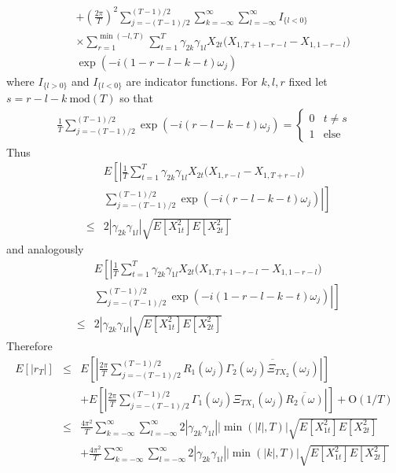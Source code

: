 \documentclass[a4paper]{book}
\begin{document}
\begin{appendix}
\begin{eqnarray*}
&&+\left(\frac{2\pi}{T}\right)^2\sum_{j=-(T-1)/2}^{(T-1)/2}\sum_{k=-\infty}^\infty
\sum_{l=-\infty}^\infty
I_{\{l<0\}}\\
&&\times\sum_{r=1}^{\min(-l,T)} \sum_{t=1}^{T} \gamma_{2k}\gamma_{1l}X_{2t} \Big(X_{1,T+1-r-l}-X_{1,1-r-l}\Big)\\
&&\exp(-i(1-r-l-k-t)\omega_j)
\end{eqnarray*}
where $I_{\{l>0\}}$ and $I_{\{l<0\}}$ are indicator functions. For
$k,l,r$ fixed let\\ $s=r-l-k ~\textrm{mod}(T)$ so that
\begin{eqnarray*}
\frac{1}{T}\sum_{j=-(T-1)/2}^{(T-1)/2}
\exp(-i(r-l-k-t)\omega_j)=\left\{\begin{array}{cc}
0& t\not=s\\
1& \textrm{else}
\end{array}\right.
\end{eqnarray*}
Thus
\begin{eqnarray*}
&&E\left[\left|\frac{1}{T} \sum_{t=1}^{T}
\gamma_{2k}\gamma_{1l}X_{2t} \Big(X_{1,r-l}-X_{1,T+r-l}\Big)\right.\right.\\
&&\left.\left.\sum_{j=-(T-1)/2}^{(T-1)/2}\exp(-i(r-l-k-t)\omega_j)\right|\right]\\
&\leq& 2|\gamma_{2k}\gamma_{1l}|\sqrt{E[X_{1t}^2]E[X_{2t}^2]}
\end{eqnarray*}
and analogously
\begin{eqnarray*}
&&E\left[\left|\frac{1}{T} \sum_{t=1}^{T}
\gamma_{2k}\gamma_{1l}X_{2t}
\Big(X_{1,T+1-r-l}-X_{1,1-r-l}\Big)\right.\right.\\
&&\left.\left. \sum_{j=-(T-1)/2}^{(T-1)/2}\exp(-i(1-r-l-k-t)\omega_j)\right|\right]\\
&\leq& 2|\gamma_{2k}\gamma_{1l}|\sqrt{E[X_{1t}^2]E[X_{2t}^2]}
\end{eqnarray*}
Therefore
\begin{eqnarray*}
E[|r_T|]&\leq&E\left[\left|\frac{2\pi}{T}\sum_{j=-(T-1)/2}^{(T-1)/2}R_1(\omega_j)
\overline{\Gamma_2(\omega_j)\Xi_{TX_2}(\omega_j)}\right|\right]\\
&&+E\left[\left|\frac{2\pi}{T}\sum_{j=-(T-1)/2}^{(T-1)/2}\Gamma_1(\omega_j)\Xi_{TX_1}(\omega_j)\overline{R_2(\omega)}
\right|\right]+\textrm{O}(1/T)\\
&\leq& \frac{4\pi^2}{T}\sum_{k=-\infty}^\infty
\sum_{l=-\infty}^\infty 2
|\gamma_{2k}\gamma_{1l}||\min(|l|,T)|\sqrt{E[X_{1t}^2]E[X_{2t}^2]}\\
&&+ \frac{4\pi^2}{T}\sum_{k=-\infty}^\infty \sum_{l=-\infty}^\infty
2
|\gamma_{2k}\gamma_{1l}||\min(|k|,T)|\sqrt{E[X_{1t}^2]E[X_{2t}^2]}\\

\end{eqnarray*}
\end{appendix}
\end{document}
